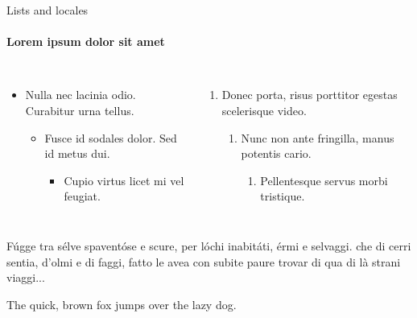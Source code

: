 \documentclass{beamer}
\begin{document}
    \begin{frame}[label=lists]{Lists and locales}
      \framesubtitle{Lorem ipsum dolor sit amet}
      \begin{columns}[onlytextwidth]
          \begin{itemize}
            \item Nulla nec lacinia odio. Curabitur urna tellus.
            \begin{itemize}
              \item Fusce id sodales dolor. Sed id metus dui.
              \begin{itemize}
                \item Cupio virtus licet mi vel feugiat.
              \end{itemize}
            \end{itemize}
          \end{itemize}
          \begin{enumerate}
            \item Donec porta, risus porttitor egestas scelerisque video.
            \begin{enumerate}
              \item Nunc non ante fringilla, manus potentis cario.
              \begin{enumerate}
                \item Pellentesque servus morbi tristique.
              \end{enumerate}
            \end{enumerate}
          \end{enumerate}
      \end{columns}
      \bigskip
      \justifying

      {\raggedright{}Fúgge tra sélve spaventóse e scure,
      per lóchi inabitáti, érmi e selvaggi.
      che di cerri sentia, d’olmi e di faggi,
      fatto le avea con subite paure
      trovar di qua di là strani viaggi...}
      {The quick, brown fox jumps over the lazy
      dog.}
    \end{frame}
\end{document}
